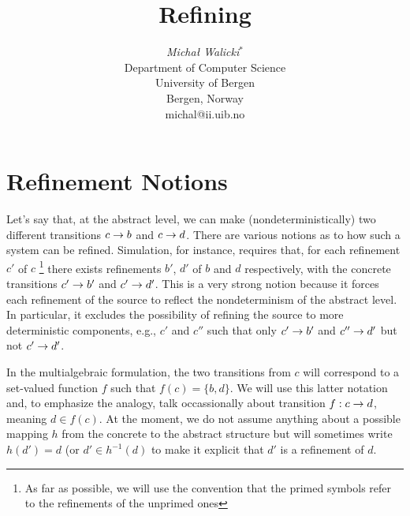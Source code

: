 




\title{Refining}

\author{{\it Micha{\l} Walicki\( ^*\)}\\
\small Department of Computer Science\\
\small University of Bergen\\
\small Bergen, Norway\\
\footnotesize michal@ii.uib.no}


\section{Refinement Notions}
Let's say that, at the abstract level, we can make (nondeterministically) two different
transitions ${c}\rightarrow{b}$ and ${c}\rightarrow{d}$. There are various notions as to how
such a system can be refined. Simulation, for instance, requires that, for each refinement
 $c'$ of $c$ \footnote{As far as possible, we will use the convention that
 the primed
symbols refer to the refinements of the unprimed ones} there exists refinements
 $b'$, $d'$ of $b$ and $d$ respectively, with the concrete transitions
 ${c'}\rightarrow{b'}$ and ${c'}\rightarrow{d'}$. This is a very strong notion
 because it forces each refinement of the source to reflect the
 nondeterminism of the abstract level. In particular, it excludes the
 possibility of refining the source to more deterministic components, e.g.,
 $c'$ and $c''$ such that only ${c'}\rightarrow{b'}$ and ${c''}\rightarrow{d'}$ but
 not ${c'}\rightarrow{d'}$.

In the multialgebraic formulation, the two transitions from $c$ will
correspond to a set-valued function $f$ such that $f(c)=\{b,d\}$. We will use
this latter notation and, to emphasize the analogy, talk occassionally about
transition $f:{c}\rightarrow{d}$, meaning $d\in f(c)$.
At the moment, we do not assume anything about a possible mapping $h$ from
the concrete to the abstract structure but will sometimes write $h(d')=d$ (or
 $d'\in h^{-1}(d)$ to make it explicit that $d'$ is a refinement of $d$.


